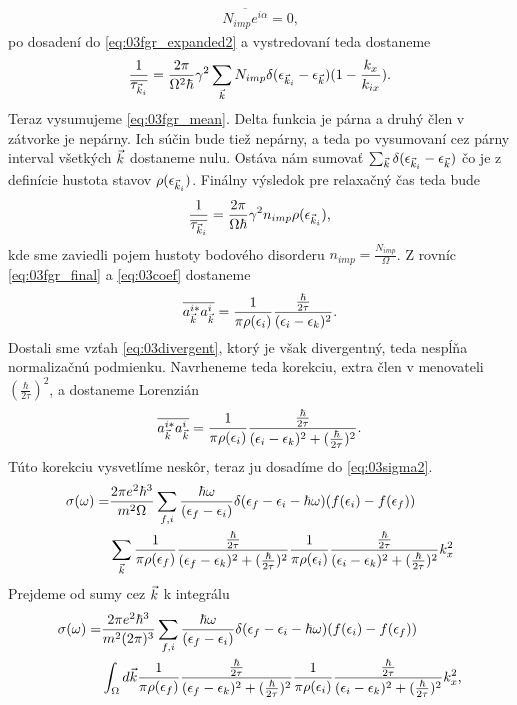 \begin{align}
\overline{N_{imp}e^{i\alpha}}=0\text{,}
\end{align}
po dosadení do \eqref{eq:03fgr_expanded2}  a vystredovaní teda dostaneme 
\begin{align}
\label{eq:03fgr_mean}
\frac{1}{\overline{\tau_{\vec{k}_i}}}=\frac{2\pi}{\Omega^2\hbar}\gamma^2\sum_{\vec{k}}N_{imp}\delta(\epsilon_{\vec{k}_i}-\epsilon_{\vec{k}})(1-\frac{k_x}{k_{ix}})\text{.}
\end{align}
Teraz vysumujeme \eqref{eq:03fgr_mean}. Delta funkcia je párna a druhý člen v zátvorke je nepárny. Ich súčin bude tiež nepárny, a teda po vysumovaní cez párny interval všetkých $\vec{k}$ dostaneme nulu. Ostáva nám sumovať $\sum_{\vec{k}}\delta(\epsilon_{\vec{k}_i}-\epsilon_{\vec{k}})$ čo je z definície hustota stavov $\rho(\epsilon_{\vec{k}_i})$. Finálny výsledok pre relaxačný čas teda bude
\begin{align}
\label{eq:03fgr_final}
\frac{1}{\overline{\tau_{\vec{k}_i}}}=\frac{2\pi}{\Omega\hbar}\gamma^2n_{imp}\rho(\epsilon_{\vec{k}_i}) \text{,}
\end{align}
kde sme zaviedli pojem hustoty bodového disorderu $n_{imp}=\frac{N_{imp}}{\Omega}$. Z rovníc \eqref{eq:03fgr_final} a \eqref{eq:03coef} dostaneme 
\begin{align}
\label{eq:03divergent}
\overline{a_{\vec{k}}^{i*}a_{\vec{k}}^i}=\frac{1}{\pi\rho(\epsilon_{i})}\frac{\frac{\hbar}{2\tau}}{(\epsilon_{i}-\epsilon_{k})^2}\text{.}
\end{align}
Dostali sme vzťah \eqref{eq:03divergent}, ktorý je však divergentný, teda nespĺňa normalizačnú podmienku. Navrheneme teda korekciu, extra člen v menovateli $(\frac{\hbar}{2\tau})^2$, a dostaneme Lorenzián
\begin{align}
\label{eq:03lorenz}
\overline{a_{\vec{k}}^{i*}a_{\vec{k}}^i}=\frac{1}{\pi\rho(\epsilon_i)}\frac{\frac{\hbar}{2\tau}}{(\epsilon_i-\epsilon_{k})^2+(\frac{\hbar}{2\tau})^2}\text{.}
\end{align}
Túto korekciu vysvetlíme neskôr, teraz ju dosadíme do \eqref{eq:03sigma2}.
\begin{align}
\sigma(\omega)=&\frac{2\pi e^2\hbar^3}{m^2\Omega}\sum_{f,i}\frac{\hbar\omega}{(\epsilon_f-\epsilon_i)}\delta(\epsilon_f-\epsilon_i-\hbar\omega)(f(\epsilon_i)-f(\epsilon_f))\\ \notag
&\sum_{\vec{k}}\frac{1}{\pi\rho(\epsilon_f)}\frac{\frac{\hbar}{2\tau}}{(\epsilon_f-\epsilon_{k})^2+(\frac{\hbar}{2\tau})^2}\frac{1}{\pi\rho(\epsilon_i)}\frac{\frac{\hbar}{2\tau}}{(\epsilon_i-\epsilon_{k})^2+(\frac{\hbar}{2\tau})^2}k_x^2
\end{align}
Prejdeme od sumy cez $\vec{k}$ k integrálu
\begin{align}
\label{eq:03sigma3}
\sigma(\omega)=&\frac{2\pi e^2\hbar^3}{m^2(2\pi)^3}\sum_{f,i}\frac{\hbar\omega}{(\epsilon_f-\epsilon_i)}\delta(\epsilon_f-\epsilon_i-\hbar\omega)(f(\epsilon_i)-f(\epsilon_f))\\ \notag
&\int_{\Omega}d\vec{k}\frac{1}{\pi\rho(\epsilon_f)}\frac{\frac{\hbar}{2\tau}}{(\epsilon_f-\epsilon_{k})^2+(\frac{\hbar}{2\tau})^2}\frac{1}{\pi\rho(\epsilon_i)}\frac{\frac{\hbar}{2\tau}}{(\epsilon_i-\epsilon_{k})^2+(\frac{\hbar}{2\tau})^2}k_x^2\text{,}
\end{align}

